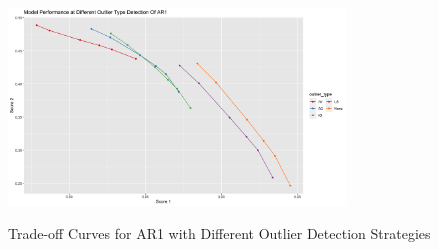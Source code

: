 \documentclass{article}
\begin{document}
\begin{figure}[htbp]
    \caption{Trade-off Curves for AR1 with Different Outlier Detection Strategies}
    \centering
    \includegraphics[width = 0.8\textwidth]{images/ModelPerformanceatDifferentOutlierTypeDetectionOfAR1.png}
    \label{fig:fig1.3.3}
\end{figure}
\end{document}
